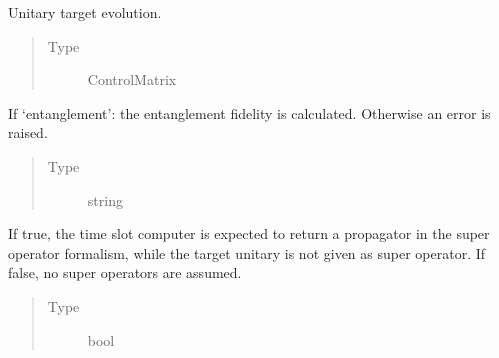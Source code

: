 \documentclass[letterpaper,10pt,english]{sphinxmanual}
\begin{document}
\begin{fulllineitems}
\begin{fulllineitems}
\begin{quote}
\begin{description}
\end{description}\end{quote}

\end{fulllineitems}


\begin{fulllineitems}
\label{\detokenize{qsim:qsim.cost_functions.OperationInfidelity.target}}
Unitary target evolution.
\begin{quote}\begin{description}
\item[{Type}] \leavevmode
ControlMatrix

\end{description}\end{quote}

\end{fulllineitems}


\begin{fulllineitems}
\label{\detokenize{qsim:qsim.cost_functions.OperationInfidelity.fidelity_measure}}
If ‘entanglement’: the entanglement fidelity is calculated.
Otherwise an error is raised.
\begin{quote}\begin{description}
\item[{Type}] \leavevmode
string

\end{description}\end{quote}

\end{fulllineitems}


\begin{fulllineitems}
\label{\detokenize{qsim:qsim.cost_functions.OperationInfidelity.super_operator_formalism}}
If true, the time slot computer is expected to return a propagator in
the super operator formalism, while the target unitary is not given as
super operator.
If false, no super operators are assumed.
\begin{quote}\begin{description}
\item[{Type}] \leavevmode
bool


\end{description}
\end{quote}
\end{fulllineitems}
\end{fulllineitems}
\end{document}
